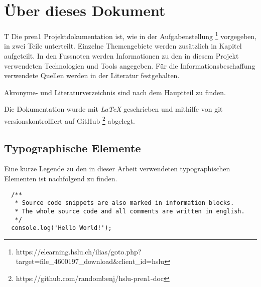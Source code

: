   \section*{Über dieses Dokument}
T
  Die \acrshort{pren1} Projektdokumentation ist, wie in der Aufgabenstellung \footnote{
    https://elearning.hslu.ch/ilias/goto.php?target=file\_4600197\_download\&client\_id=hslu
  } vorgegeben, in zwei Teile unterteilt.
  Einzelne Themengebiete werden zusätzlich in Kapitel aufgeteilt.
  In den Fussnoten werden Informationen zu den in diesem Projekt verwendeten
  Technologien und Tools angegeben.
  Für die Informationsbeschaffung verwendete Quellen werden in der Literatur
  festgehalten.

Akronyme- und Literaturverzeichnis sind nach dem Hauptteil zu finden.

  Die Dokumentation wurde mit {\it LaTeX} geschrieben und mithilfe von git
  versionskontrolliert auf GitHub \footnote{https://github.com/randombenj/hslu-pren1-doc}
  abgelegt.
  
  \subsection*{Typographische Elemente}

  Eine kurze Legende zu den in dieser Arbeit verwendeten typographischen Elementen
  ist nachfolgend zu finden.


  \begin{verbatim}
  /**
   * Source code snippets are also marked in information blocks.
   * The whole source code and all comments are written in english.
   */
  console.log('Hello World!');
  \end{verbatim}
  
  \newpage 